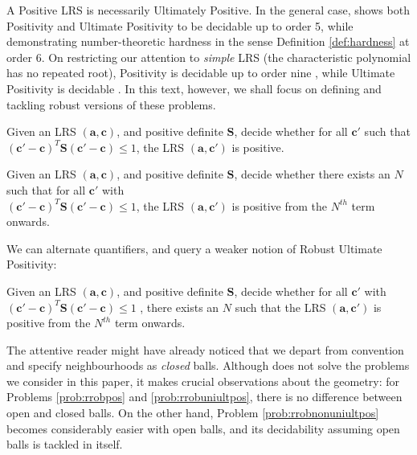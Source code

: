 A Positive LRS is necessarily Ultimately Positive. In the general case, \cite{joeljames3} shows both Positivity and Ultimate Positivity to be decidable up to order 5, while demonstrating number-theoretic hardness in the sense Definition \ref{def:hardness} at order $6$. On restricting our attention to \textit{simple} LRS (the characteristic polynomial has no repeated root), Positivity is decidable up to order nine \cite{ouaknine2014positivity}, while Ultimate Positivity is decidable \cite{ouaknine2014ultimate}. In this text, however, we shall focus on defining and tackling robust versions of these problems.

\begin{problem}
\label{prob:rrobpos}
Given an LRS $(\mathbf{a}, \mathbf{c})$, and positive definite $\mathbf{S}$, decide whether for all $\mathbf{c'}$ such that $(\mathbf{c'} - \mathbf{c})^T\mathbf{S}(\mathbf{c'} - \mathbf{c}) \le 1$, the LRS $(\mathbf{a}, \mathbf{c'})$ is positive.
\end{problem}

\begin{problem}
\label{prob:rrobuniultpos}
Given an LRS $(\mathbf{a}, \mathbf{c})$, and positive definite $\mathbf{S}$, decide whether there exists an $N$ such that for all $\mathbf{c'}$ with\\ $(\mathbf{c'} - \mathbf{c})^T\mathbf{S}(\mathbf{c'} - \mathbf{c}) \le 1$, the LRS $(\mathbf{a}, \mathbf{c'})$ is positive from the $N^{th}$ term onwards.
\end{problem}

We can alternate quantifiers, and query a weaker notion of Robust Ultimate Positivity:
\begin{problem}
\label{prob:rrobnonuniultpos}
Given an LRS $(\mathbf{a}, \mathbf{c})$, and positive definite $\mathbf{S}$, decide whether for all $\mathbf{c'}$ with $(\mathbf{c'} - \mathbf{c})^T\mathbf{S}(\mathbf{c'} - \mathbf{c}) \le 1$ , there exists an $N$ such that the LRS $(\mathbf{a}, \mathbf{c'})$ is positive from the $N^{th}$ term onwards.
\end{problem}

The attentive reader might have already noticed that we depart from convention and specify neighbourhoods as \textit{closed} balls. Although \cite{originalarxiv} does not solve the problems we consider in this paper, it makes crucial observations about the geometry: for Problems \ref{prob:rrobpos} and \ref{prob:rrobuniultpos}, there is no difference between open and closed balls. On the other hand, Problem \ref{prob:rrobnonuniultpos} becomes considerably easier with open balls, and its decidability assuming open balls is tackled in \cite{originalarxiv} itself. 

